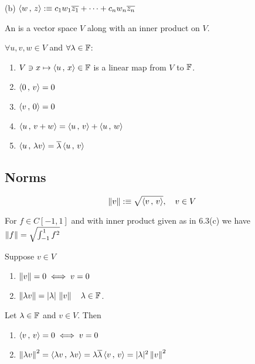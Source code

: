 \begin{example}
  (b) $\left \langle w \, , \, z \right \rangle :\equiv c_1 w_1 \overline{z_1} + \cdots + c_n w_n \overline{z_n}$
\end{example}

\begin{mydef}
  An  is a vector space $V$ along with an inner product on $V$.
\end{mydef}

\setcounter{thm}{5}

\begin{thm}
  $\forall u,v,w \in V$ and $\forall \lambda \in \mathbb{F}$:
  \begin{enumerate}[label=\textbf{(\alph*)}]
    \item $V \ni x \mapsto \left \langle u \, , \, x \right \rangle \in \mathbb{F}$ is a linear map from $V$ to $\mathbb{F}$.
    \item $\left \langle 0 \, , \, v \right \rangle = 0 $
    \item $\left \langle v \, , \, 0 \right \rangle = 0$
    \item $\left \langle u \, , \, v+w \right \rangle = \left \langle u \, , \, v \right \rangle + \left \langle u \, , \, w \right \rangle $
    \item $\left \langle u \, , \, \lambda v \right \rangle = \overline{\lambda} \left \langle u \, , \, v \right \rangle$
  \end{enumerate}
\end{thm}

\subsection{Norms}

\begin{mydef} [norm]
  \begin{equation}
    \left \lVert v \right \rVert :\equiv \sqrt{\left \langle v \, , \, v \right \rangle}, \quad v \in  V
  \end{equation}
\end{mydef}

\begin{example}
  For $f \in C[-1,1]$ and with inner product given as in 6.3(c) we have $\left \lVert f \right \rVert = \sqrt { \int_{-1}^{1} f^2}$

\end{example}

\begin{thm} 
  Suppose $v \in V$
  \begin{enumerate}[label=\textbf{(\alph*)}]
    \item $\left \lVert v \right \rVert = 0 \iff v = 0$
    \item $\left \lVert \lambda v \right \rVert = |\lambda| \,\left \lVert v \right \rVert \quad \lambda \in \mathbb{F}$.
  \end{enumerate}
\end{thm}
\begin{prf}
  Let $\lambda \in \mathbb{F}$ and $v \in V$. Then
  \begin{enumerate}[label=\textbf{(\alph*)}]
    \item $\left \langle v \, , \, v \right \rangle = 0 \iff v=0$
    \item $\left \lVert \lambda v \right \rVert^2 = \left \langle \lambda v \, , \, \lambda v \right \rangle = \lambda \overline{\lambda} \left \langle v \, , \, v \right \rangle = |\lambda|^2 \left \lVert v \right \rVert^2$
  \end{enumerate}
  \vspace{-1em}
\end{prf}

